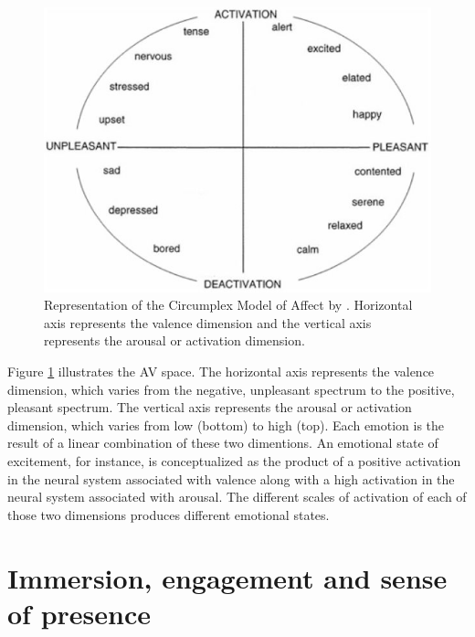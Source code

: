\begin{figure}[h!]
    \centering
    \includegraphics[scale=0.5]{Content/figures/russell-av.png}
    \caption{Representation of the Circumplex Model of Affect by \textcite{posner2005circumplex}. Horizontal axis represents the valence dimension and the vertical axis represents the arousal or activation dimension.}
    \label{fig:av-model}
\end{figure}

Figure \ref{fig:av-model} illustrates the AV space. The horizontal axis represents the valence dimension, which varies from the negative, unpleasant spectrum to the positive, pleasant spectrum. The vertical axis represents the arousal or activation dimension, which varies from low (bottom) to high (top). Each emotion is the result of a linear combination of these two dimentions. An emotional state of excitement, for instance, is conceptualized as the product of a positive activation in the neural system associated with valence along with a high activation in the neural system associated with arousal. The different scales of activation of each of those two dimensions produces different emotional states.

\section{Immersion, engagement and sense of presence}

